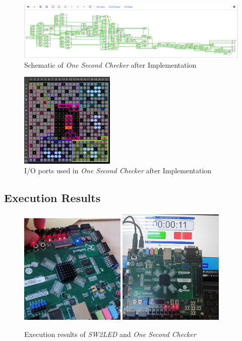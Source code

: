 \documentclass{article}
\begin{document}
\begin{figure}[htb!]
	\centering
	\includegraphics[width=1\textwidth]{fig/Schematic.png}
\caption{Schematic of \textit{One Second Checker} after Implementation}
\label{schematic}
\end{figure}
\begin{figure}[htb!]
	\centering
	\includegraphics[width=0.4\textwidth]{fig/IO.png}
\caption{I/O ports used in \textit{One Second Checker} after Implementation}
\label{io}
\end{figure}

\newpage
\subsection{Execution Results}

\begin{figure}[htb!]
	\centering
	\includegraphics[width=0.45\textwidth]{fig/sw2led.png}
	\includegraphics[width=0.45\textwidth]{fig/one_sec_checker.png}
\caption{Execution results of \textit{SW2LED} and \textit{One Second Checker}}
\label{execution}
\end{figure}
\end{document}
